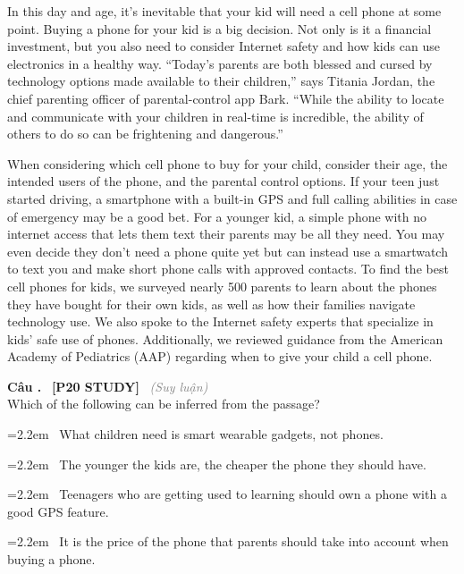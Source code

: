 \documentclass[12pt,a4paper,twoside]{article}
\newcounter{qcounter}
\newcommand{\question}[2][]{%
    \stepcounter{qcounter}%
    \par\vspace{6pt}%
    \noindent\textcolor{primaryBlue}{\textbf{Câu \theqcounter.}}~%
    \textcolor{secondaryBlue}{\small\textbf{[P20 STUDY]}}~%
    \if\relax\detokenize{#1}\relax\else\textcolor{gray}{\small\textit{(#1)}}~\fi\\[1pt]
    \noindent #2%
}
\newcommand{\choiceitem}[2]{%
    \tikz[baseline=-0.5ex]{%
        \node[draw=primaryBlue, circle, minimum size=1.5em, inner sep=0pt, thick] {\textbf{#1}};%
    }~#2%
}
\newenvironment{readingpassage}[1][]{%
    \begin{tcolorbox}[enhanced, colback=grayLight, colframe=secondaryBlue,
        coltitle=textDark, fonttitle=\bfseries, title={#1},
        rounded corners, arc=3mm, boxrule=1pt,
        left=15pt, right=15pt, top=10pt, bottom=10pt,
        breakable, before skip=10pt, after skip=10pt, drop fuzzy shadow]
    \setstretch{1.3}
}{\end{tcolorbox}}
\begin{document}
\begin{readingpassage}[]
In this day and age, it's inevitable that your kid will need a cell phone at some point. Buying a phone for your kid is a big decision. Not only is it a financial investment, but you also need to consider Internet safety and how kids can use electronics in a healthy way. “Today’s parents are both blessed and cursed by technology options made available to their children,” says Titania Jordan, the chief parenting officer of parental-control app Bark. “While the ability to locate and communicate with your children in real-time is incredible, the ability of others to do so can be frightening and dangerous.”

When considering which cell phone to buy for your child, consider their age, the intended users of the phone, and the parental control options. If your teen just started driving, a smartphone with a built-in GPS and full calling abilities in case of emergency may be a good bet. For a younger kid, a simple phone with no internet access that lets them text their parents may be all they need. You may even decide they don't need a phone quite yet but can instead use a smartwatch to text you and make short phone calls with approved contacts. To find the best cell phones for kids, we surveyed nearly 500 parents to learn about the phones they have bought for their own kids, as well as how their families navigate technology use. We also spoke to the Internet safety experts that specialize in kids’ safe use of phones. Additionally, we reviewed guidance from the American Academy of Pediatrics (AAP) regarding when to give your child a cell phone.
\end{readingpassage}

\question[Suy luận]{Which of the following can be inferred from the passage?}

\par\vspace{4pt}
\noindent\hangindent=2.2em\choiceitem{A}{What children need is smart wearable gadgets, not phones.}\par\vspace{4pt}
\noindent\hangindent=2.2em\choiceitem{B}{The younger the kids are, the cheaper the phone they should have.}\par\vspace{4pt}
\noindent\hangindent=2.2em\choiceitem{C}{Teenagers who are getting used to learning should own a phone with a good GPS feature.}\par\vspace{4pt}
\noindent\hangindent=2.2em\choiceitem{D}{It is the price of the phone that parents should take into account when buying a phone.}\par\vspace{4pt}
\end{document}
